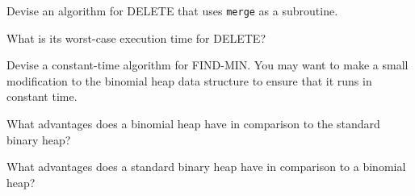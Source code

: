 \documentclass{tufte-handout}
\begin{document}
\begin{questions}
\item Devise an algorithm for DELETE that uses \verb|merge| as a subroutine. 

\item What is its worst-case execution time for DELETE?

\item Devise a constant-time algorithm for FIND-MIN. You may want to make a small modification to the binomial heap data structure to ensure that it runs in constant time.

\item What advantages does a binomial heap have in comparison to the standard binary heap?

\item What advantages does a standard binary heap have in comparison to a binomial heap?

\end{questions}
\end{document}
